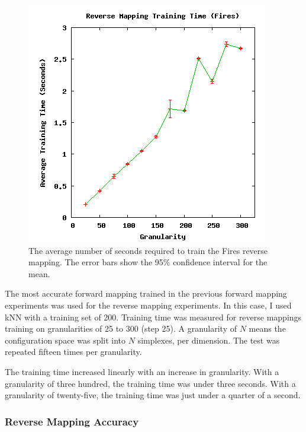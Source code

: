 \begin{figure}[ht]
\centering
\includegraphics[scale=.5]{images/results_fires/rmtraining.png}
\caption{The average number of seconds required to train the Fires reverse mapping.
The error bars show the 95\% confidence interval for the mean.}
\label{fig:rmtraining}
\end{figure}

The most accurate forward mapping trained in the previous forward mapping experiments was used for the reverse mapping experiments.
In this case, I used kNN with a training set of 200.
Training time was measured for reverse mappings training on granularities of 25 to 300 (step 25).
A granularity of $N$ means the configuration space was split into $N$ simplexes, per dimension.
The test was repeated fifteen times per granularity.

The training time increased linearly with an increase in granularity.
With a granularity of three hundred, the training time was under three seconds.
With a granularity of twenty-five, the training time was just under a quarter of a second.


\subsubsection{Reverse Mapping Accuracy}

